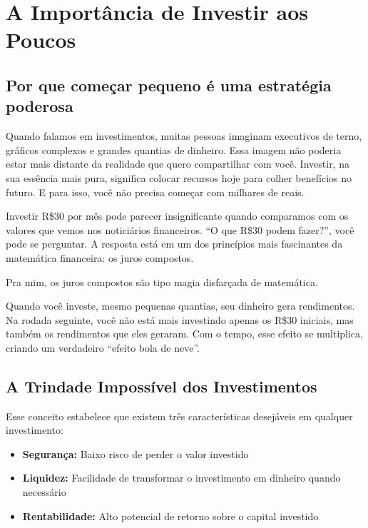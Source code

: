 \documentclass[
  12pt,
  a4paper,
  openright,
  oneside,
  chapter=TITLE,
  section=TITLE
]{abntex2}
\begin{document}
\chapter{A Importância de Investir aos Poucos}

\section{Por que começar pequeno é uma estratégia poderosa}

\noindent Quando falamos em investimentos, muitas pessoas imaginam executivos de terno, gráficos complexos e grandes quantias de dinheiro. Essa imagem não poderia estar mais distante da realidade que quero compartilhar com você. Investir, na sua essência mais pura, significa colocar recursos hoje para colher benefícios no futuro. E para isso, você não precisa começar com milhares de reais.

\vspace{0.5cm}
\noindent Investir R\$30 por mês pode parecer insignificante quando comparamos com os valores que vemos nos noticiários financeiros. ``O que R\$30 podem fazer?'', você pode se perguntar. A resposta está em um dos princípios mais fascinantes da matemática financeira: os juros compostos.

\vspace{0.5cm}
\noindent Pra mim, os juros compostos são tipo magia disfarçada de matemática.

\vspace{0.5cm}
\noindent Quando você investe, mesmo pequenas quantias, seu dinheiro gera rendimentos. Na rodada seguinte, você não está mais investindo apenas os R\$30 iniciais, mas também os rendimentos que eles geraram. Com o tempo, esse efeito se multiplica, criando um verdadeiro ``efeito bola de neve''.

\section{A Trindade Impossível dos Investimentos}

\noindent Esse conceito estabelece que existem três características desejáveis em qualquer investimento:

\begin{itemize}[leftmargin=*]
    \item \textbf{Segurança:} Baixo risco de perder o valor investido
    \item \textbf{Liquidez:} Facilidade de transformar o investimento em dinheiro quando necessário
    \item \textbf{Rentabilidade:} Alto potencial de retorno sobre o capital investido
\end{itemize}
\end{document}
